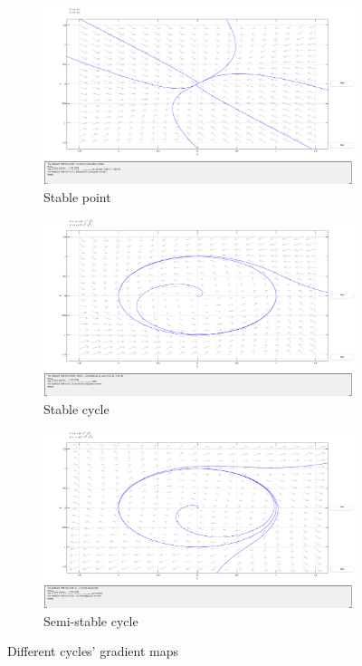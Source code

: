 \begin{figure}[!htb]
  \centering
  \begin{subfigure}[b]{0.45\linewidth}
    \centering
    \includegraphics[trim=116 155 125 55,clip,width=\linewidth]{imgs/stable-point}
    \caption{Stable point}%
    \label{fig:stable-point}
  \end{subfigure}
  \begin{subfigure}[b]{0.45\linewidth}
    \centering
    \includegraphics[trim=116 155 125 55,clip,width=\linewidth]{imgs/stable-cycle}
    \caption{Stable cycle}%
    \label{fig:stable-cycle}
  \end{subfigure}
  \begin{subfigure}[b]{0.5\linewidth}
    \centering
    \includegraphics[trim=116 155 125 55,clip,width=\linewidth]{imgs/semi-stable-cycle}
    \caption{Semi-stable cycle}%
    \label{fig:semi-stable-cycle}
  \end{subfigure}
  \caption{Different cycles' gradient maps}%
  \label{fig:poincare-cycles}
\end{figure}

